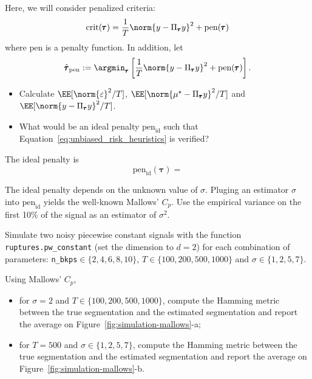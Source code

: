 \documentclass[11pt]{article}
\begin{document}
Here, we will consider penalized criteria:
\begin{equation}
    \text{crit}(\pmb{\tau}) = \frac{1}{T}\norm{y - \Pi_{\pmb{\tau}}y}^2 + \text{pen}(\pmb{\tau})
\end{equation}
where $\text{pen}$ is a penalty function.
In addition, let 
\begin{equation}
    \hat{\pmb{\tau}}_{\text{pen}} := \argmin_{\pmb{\tau}} \left[ \frac{1}{T}\norm{y - \Pi_{\pmb{\tau}}y}^2 + \text{pen}(\pmb{\tau})\right].
\end{equation}

\newpage
\begin{exercise}[subtitle=Ideal penalty]
\begin{itemize}
    \item Calculate $\EE[\norm{\varepsilon}^2/T]$, $\EE[\norm{\mu^\star - \Pi_{\pmb{\tau}}y}^2/T]$ and $\EE[\norm{y - \Pi_{\pmb{\tau}}y}^2/T]$.
    \item What would be an ideal penalty $\text{pen}_{\text{id}}$ such that Equation~\eqref{eq:unbiased_risk_heuristics} is verified?
\end{itemize}

\end{exercise}

\begin{solution}  %
The ideal penalty is 
\begin{equation}
    \text{pen}_{\text{id}} (\pmb{\tau}) = 
\end{equation}
\end{solution}

\newpage
\begin{exercise}[subtitle=Mallows' $C_p$]
The ideal penalty depends on the unknown value of $\sigma$. Pluging an estimator $\hat{\sigma}$ into $\text{pen}_{\text{id}}$ yields the well-known Mallows' $C_p$. Use the empirical variance on the first 10\% of the signal as an estimator of $\sigma^2$.

Simulate two noisy piecewise constant signals with the function \texttt{ruptures.pw\_constant} (set the dimension to $d=2$) for each combination of parameters: \texttt{n\_bkps}$\in\{2, 4, 6, 8, 10\}$, $T\in \{100, 200, 500, 1000\}$ and $\sigma\in \{1, 2, 5, 7\}$.


Using Mallows' $C_p$,
\begin{itemize}
    \item for $\sigma = 2$ and $T\in \{100, 200, 500, 1000\}$, compute the Hamming metric between the true segmentation and the estimated segmentation and report the average on Figure~\ref{fig:simulation-mallows}-a;
    \item for $T = 500$ and $\sigma\in \{1, 2, 5, 7\}$, compute the Hamming metric between the true segmentation and the estimated segmentation and report the average on Figure~\ref{fig:simulation-mallows}-b.
\end{itemize}
\end{exercise}
\end{document}
